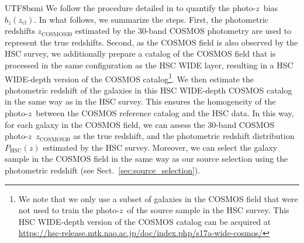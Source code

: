 \documentclass[longauth]{aa}
\newcommand{\redshift}{\ensuremath{z}}
\newcommand{\zcl}{\ensuremath{z_{\mathrm{cl}}}}
\newcommand{\bz}{\ensuremath{b_{z}}}
\begin{document}
\begin{CJK*}{UTF8}{bsmi}
We follow the procedure detailed in \cite{miyatake19} to quantify the photo-\redshift\ bias $\bz(\zcl)$.
In what follows, we summarize the steps.
First, the photometric redshifts ${\redshift}_{\mathrm{COSMOS30}}$ estimated by the 30-band COSMOS photometry \citep{laigle16} are used to represent the true redshifts.
Second, as the COSMOS field is also observed by the HSC survey, we additionally prepare a catalog of the COSMOS field that is processed in the same configuration as the HSC WIDE layer, resulting in a HSC WIDE-depth version of the COSMOS catalog\footnote{We note that we only use a subset of galaxies in the COSMOS field that were not used to train the photo-\redshift\ of the source sample in the HSC survey. This HSC WIDE-depth version of the COSMOS catalog can be acquired at \url{https://hsc-release.mtk.nao.ac.jp/doc/index.php/s17a-wide-cosmos/}}.
We then estimate the photometric redshift of the galaxies in this HSC WIDE-depth COSMOS catalog in the same way as in the HSC survey.
This ensures the homogeneity of the photo-\redshift\ between the COSMOS reference catalog and the HSC data.
In this way, for each galaxy in the COSMOS field, we can assess the 30-band COSMOS photo-\redshift\ ${\redshift}_{\mathrm{COSMOS30}}$ as the true redshift, and the photometric redshift distribution $P_{\mathrm{HSC}}\left(\redshift\right)$ estimated by the HSC survey.
Moreover, we can select the galaxy sample in the COSMOS field in the same way as our source selection using the photometric redshift (see Sect.~\ref{sec:source_selection}).


\end{CJK*}
\end{document}

